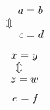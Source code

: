 \documentclass{article}
\begin{document}
\begin{align}
a &= b \\
\ArrowBetweenLines
c &= d
\end{align}
\begin{gather}
x = y \\
\ArrowBetweenLines
z = w
\end{gather}
\begin{equation} e = f \end{equation}
\end{document}
